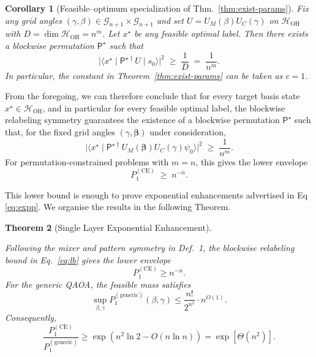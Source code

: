 \documentclass[a4paper,onecolumn,11pt,unpublished]{quantumarticle}
\newtheorem{theorem}{Theorem}
\newtheorem{corollary}[theorem]{Corollary}
\theoremstyle{remark}
\newcommand{\OH}{\mathcal{H}_{\mathrm{OH}}}
\begin{document}
 \newcommand{\UM}{U_{M}}
\newcommand{\UC}{U_{C}}


 \begin{corollary}[Feasible–optimum specialization of Thm.~\ref{thm:exist-params}\cite{onahce}]
 \label{cor:feasible-optimum} Fix any grid angles $(\gamma,\beta)\in\mathcal G_{n+1}\times\mathcal G_{n+1}$ and set $U=\UM(\beta)\UC(\gamma)$ on $\OH$ with $D=\dim\OH=n^m$. Let $x^\star$ be any \emph{feasible optimal} label. Then there exists a blockwise permutation $\mathsf P^\star$ such that \[ \bigl|\langle x^\star \mid \mathsf P^{\star\dagger} U \mid s_0 \rangle\bigr|^2 \;\ge\; \frac{1}{D} \;=\; \frac{1}{n^m}. \] In particular, the constant in Theorem~\ref{thm:exist-params} can be taken as $c=1$. \end{corollary}

\medskip
\noindent




From the foregoing, we can therefore conclude that for every target basis
state \(x^{\star}\in\OH\), and in particular for every feasible optimal label,
the blockwise relabeling symmetry guarantees the existence of a blockwise
permutation \(\mathsf P^\star\) such that, for the fixed grid angles
\((\gamma,\boldsymbol\beta)\) under consideration,
\begin{equation}
  \bigl|\langle x^{\star}\!\mid
          \mathsf P^{\star\dagger}
          U_{M}(\boldsymbol\beta)
          U_{C}(\gamma)
          \psi_{0}\rangle
  \bigr|^{2}
  \;\ge\;
  \frac{1}{n^{m}}.
  \label{eq:lb}
\end{equation}
For permutation-constrained problems with \(m=n\), this gives the lower
envelope
\[
  P_{1}^{\mathrm{(CE)}} \;\ge\; n^{-n}.
\]

This lower bound is enough to prove exponential enhancements advertised in Eq \ref{eq:expp}. We organise the results in the following Theorem.




\begin{theorem}[Single Layer Exponential Enhancement] 
\label{thm:p1-sep}

Following the mixer and pattern symmetry in Def.~1, the blockwise relabeling
bound in Eq.~\eqref{eq:lb} gives the lower envelope
\[
  P_{1}^{\mathrm{(CE)}}\ge n^{-n}.
\]
For the generic QAOA, the feasible mass satisfies
\[
  \sup_{\beta,\gamma} P_{1}^{\mathrm{(generic)}}(\beta,\gamma)
  \le
  \frac{n!}{2^{n^2}}\cdot n^{O(1)}.
\]
Consequently,
\[
  \frac{P_{1}^{\mathrm{(CE)}}}{P_{1}^{\mathrm{(generic)}}}
  \ge
  \exp\!\left(n^2\ln 2-O(n\ln n)\right)
  =
  \exp[\Theta(n^2)].
\]
\end{theorem}
\end{document}
